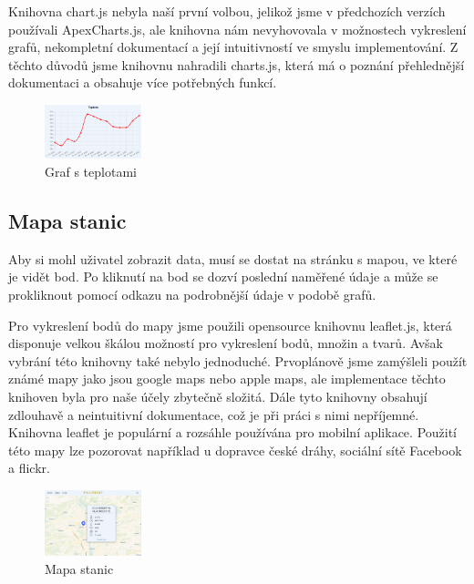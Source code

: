 Knihovna chart.js nebyla naší první volbou, jelikož jsme v předchozích verzích používali ApexCharts.js, ale knihovna nám nevyhovovala v možnostech vykreslení grafů, nekompletní dokumentací a její intuitivností ve smyslu implementování.
Z těchto důvodů jsme knihovnu nahradili charts.js, která má o poznání přehlednější dokumentaci a obsahuje více potřebných funkcí.

\begin{figure}[h] %
    \centering
    \includegraphics[width=0.25\textwidth]{images/graf.png}
    \caption{Graf s teplotami}
    \label{ukazka_grafu}
\end{figure}

\subsection{Mapa stanic}
Aby si mohl uživatel zobrazit data, musí se dostat na stránku s mapou, ve které je vidět bod. Po kliknutí na bod se dozví poslední naměřené údaje a může se prokliknout pomocí odkazu na podrobnější údaje v podobě grafů.

Pro vykreslení bodů do mapy jsme použili opensource knihovnu leaflet.js, která disponuje velkou škálou možností pro vykreslení bodů, množin a tvarů.
Avšak vybrání této knihovny také nebylo jednoduché. Prvoplánově jsme zamýšleli použít známé mapy jako jsou google maps nebo apple maps, ale implementace těchto knihoven byla pro naše účely zbytečně složitá. Dále tyto knihovny obsahují zdlouhavě a neintuitivní dokumentace, což je při práci s nimi nepříjemné.
Knihovna leaflet je populární a rozsáhle používána pro mobilní aplikace. Použití této mapy lze pozorovat například u dopravce české dráhy, sociální sítě Facebook a flickr.

\begin{figure}[h] %
    \centering
    \includegraphics[width=0.25\textwidth]{images/mapa.png}
    \caption{Mapa stanic}
    \label{mapa}
\end{figure}


